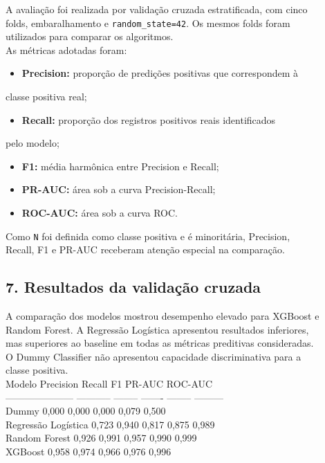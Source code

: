 \documentclass{article}
\begin{document}
A avaliação foi realizada por validação cruzada estratificada, com cinco \\
folds, embaralhamento e \texttt{random\_state=42}. Os mesmos folds foram \\
utilizados para comparar os algoritmos. \\

As métricas adotadas foram: \\

\begin{itemize}
  \item   \textbf{Precision:} proporção de predições positivas que correspondem à
\end{itemize}
classe positiva real; \\
\begin{itemize}
  \item   \textbf{Recall:} proporção dos registros positivos reais identificados
\end{itemize}
pelo modelo; \\
\begin{itemize}
  \item   \textbf{F1:} média harmônica entre Precision e Recall;
  \item   \textbf{PR-AUC:} área sob a curva Precision-Recall;
  \item   \textbf{ROC-AUC:} área sob a curva ROC.
\end{itemize}

Como \texttt{N} foi definida como classe positiva e é minoritária, Precision, \\
Recall, F1 e PR-AUC receberam atenção especial na comparação. \\

\subsection{7. Resultados da validação cruzada}

A comparação dos modelos mostrou desempenho elevado para XGBoost e \\
Random Forest. A Regressão Logística apresentou resultados inferiores, \\
mas superiores ao baseline em todas as métricas preditivas consideradas. \\
O Dummy Classifier não apresentou capacidade discriminativa para a \\
classe positiva. \\

Modelo                  Precision   Recall      F1   PR-AUC   ROC-AUC \\
--------------------- ----------- -------- ------- -------- --------- \\
Dummy                       0,000    0,000   0,000    0,079     0,500 \\
Regressão Logística         0,723    0,940   0,817    0,875     0,989 \\
Random Forest               0,926    0,991   0,957    0,990     0,999 \\
XGBoost                     0,958    0,974   0,966    0,976     0,996 \\
\end{document}
